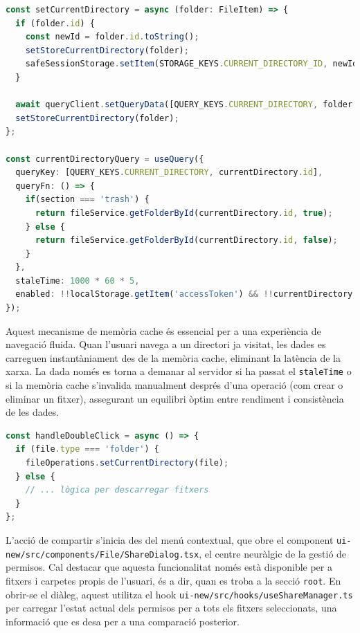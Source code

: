\begin{lstlisting}[language=typescript, caption={Gestió del directori actual amb `useQuery` a `useFileOperations.ts`}]
const setCurrentDirectory = async (folder: FileItem) => {
  if (folder.id) {
    const newId = folder.id.toString();
    setStoreCurrentDirectory(folder);
    safeSessionStorage.setItem(STORAGE_KEYS.CURRENT_DIRECTORY_ID, newId);
  }
  
  await queryClient.setQueryData([QUERY_KEYS.CURRENT_DIRECTORY, folder.id], folder);
  setStoreCurrentDirectory(folder);
};

const currentDirectoryQuery = useQuery({
  queryKey: [QUERY_KEYS.CURRENT_DIRECTORY, currentDirectory.id],
  queryFn: () => {
    if(section === 'trash') {
      return fileService.getFolderById(currentDirectory.id, true);
    } else {
      return fileService.getFolderById(currentDirectory.id, false);
    }
  }, 
  staleTime: 1000 * 60 * 5,
  enabled: !!localStorage.getItem('accessToken') && !!currentDirectory.id,
});
\end{lstlisting}

Aquest mecanisme de memòria cache és essencial per a una experiència de navegació fluida. Quan l'usuari navega a un directori ja visitat, les dades es carreguen instantàniament des de la memòria cache, eliminant la latència de la xarxa. La dada només es torna a demanar al servidor si ha passat el \texttt{staleTime} o si la memòria cache s'invalida manualment després d'una operació (com crear o eliminar un fitxer), assegurant un equilibri òptim entre rendiment i consistència de les dades.

\begin{lstlisting}[language=typescript, caption={Navegació per doble clic a `File/index.tsx`}]
const handleDoubleClick = async () => {
  if (file.type === 'folder') {
    fileOperations.setCurrentDirectory(file);
  } else {
    // ... lògica per descarregar fitxers
  }
};
\end{lstlisting}

L'acció de compartir s'inicia des del menú contextual, que obre el component \texttt{ui-new/src/components/File/ShareDialog.tsx}, el centre neuràlgic de la gestió de permisos. Cal destacar que aquesta funcionalitat només està disponible per a fitxers i carpetes propis de l'usuari, és a dir, quan es troba a la secció \texttt{root}. En obrir-se el diàleg, aquest utilitza el hook \texttt{ui-new/src/hooks/useShareManager.ts} per carregar l'estat actual dels permisos per a tots els fitxers seleccionats, una informació que es desa per a una comparació posterior.

